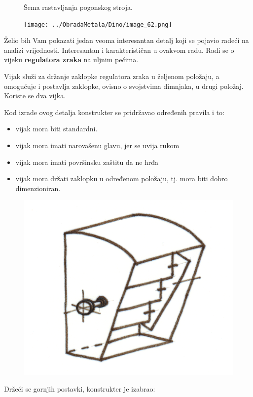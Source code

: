 \documentclass[a4paper,12pt]{article}
\numberwithin{figure}{section}
\begin{document}
\begin{landscape}
\begin{figure}

\caption{Šema rastavljanja pogonskog stroja.}\label{Slika2}
\end{figure}
\end{landscape}
\clearpage
\begin{figure}[!h]
\centering
\texttt{[image: ../ObradaMetala/Dino/image\_62.png]}
\end{figure}
\FloatBarrier

Želio bih Vam pokazati jedan veoma interesantan detalj koji se pojavio radeći na analizi vrijednosti. Interesantan i karakterističan u ovakvom radu. Radi se o vijeku \textbf{regulatora zraka} na uljnim pećima.\par

Vijak služi za držanje zaklopke regulatora zraka u željenom položaju, a omogućuje i postavlja zaklopke, ovisno o svojstvima dimnjaka, u drugi položaj. Koriste se dva vijka.\par
Kod izrade ovog detalja konstrukter se pridržavao određenih pravila i to:
\begin{itemize}
\item vijak mora biti standardni.
\item vijak mora imati narovašenu glavu, jer se uvija rukom
\item vijak mora imati površinsku zaštitu da ne hrđa
\item vijak mora držati zaklopku u određenom položaju, tj. mora biti dobro dimenzioniran.
\end{itemize}
\begin{figure}[!h]
\centering
\includegraphics[scale=0.15]{../ObradaMetala/Dino/image_66.png}
\end{figure}
\FloatBarrier
Držeći se gornjih postavki, konstrukter je izabrao:
\end{document}
